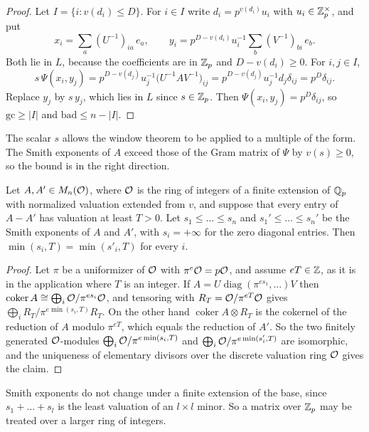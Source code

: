 \begin{proof}
Let $I=\{i:v(d_i)\le D\}$. For $i\in I$ write $d_i=p^{v(d_i)}u_i$ with $u_i\in\mathbb Z_p^\times$, and put
\[
x_i=\sum_a(U^{-1})_{ia}\,e_a,\qquad y_i=p^{D-v(d_i)}u_i^{-1}\sum_b(V^{-1})_{bi}\,e_b .
\]
Both lie in $L$, because the coefficients are in $\mathbb Z_p$ and $D-v(d_i)\ge0$. For $i,j\in I$,
\[
s\,\Psi(x_i,y_j)=p^{D-v(d_j)}u_j^{-1}\big(U^{-1}AV^{-1}\big)_{ij}=p^{D-v(d_j)}u_j^{-1}d_j\delta_{ij}=p^D\delta_{ij}.
\]
Replace $y_j$ by $s\,y_j$, which lies in $L$ since $s\in\mathbb Z_p$. Then $\Psi(x_i,y_j)=p^D\delta_{ij}$, so $\mathrm{gc}\ge\lvert I\rvert$ and $\mathrm{bad}\le n-\lvert I\rvert$.
\end{proof}

The scalar $s$ allows the window theorem to be applied to a multiple of the form. The Smith exponents of $A$ exceed those of the Gram matrix of $\Psi$ by $v(s)\ge0$, so the bound is in the right direction.

\begin{lemma}\label{w1:lem:trunc}
Let $A,A'\in M_n(\mathcal O)$, where $\mathcal O$ is the ring of integers of a finite extension of $\mathbb Q_p$ with normalized valuation extended from $v$, and suppose that every entry of $A-A'$ has valuation at least $T>0$. Let $s_1\le\dots\le s_n$ and $s_1'\le\dots\le s_n'$ be the Smith exponents of $A$ and $A'$, with $s_i=+\infty$ for the zero diagonal entries. Then $\min(s_i,T)=\min(s'_i,T)$ for every $i$.
\end{lemma}

\begin{proof}
Let $\pi$ be a uniformizer of $\mathcal O$ with $\pi^e\mathcal O=p\mathcal O$, and assume $eT\in\mathbb Z$, as it is in the application where $T$ is an integer. If $A=U\operatorname{diag}(\pi^{es_1},\dots)V$ then $\operatorname{coker}A\cong\bigoplus_i\mathcal O/\pi^{es_i}\mathcal O$, and tensoring with $R_T=\mathcal O/\pi^{eT}\mathcal O$ gives $\bigoplus_iR_T/\pi^{e\min(s_i,T)}R_T$. On the other hand $\operatorname{coker}A\otimes R_T$ is the cokernel of the reduction of $A$ modulo $\pi^{eT}$, which equals the reduction of $A'$. So the two finitely generated $\mathcal O$-modules $\bigoplus_i\mathcal O/\pi^{e\min(s_i,T)}$ and $\bigoplus_i\mathcal O/\pi^{e\min(s'_i,T)}$ are isomorphic, and the uniqueness of elementary divisors over the discrete valuation ring $\mathcal O$ gives the claim.
\end{proof}

Smith exponents do not change under a finite extension of the base, since $s_1+\dots+s_l$ is the least valuation of an $l\times l$ minor. So a matrix over $\mathbb Z_p$ may be treated over a larger ring of integers.


